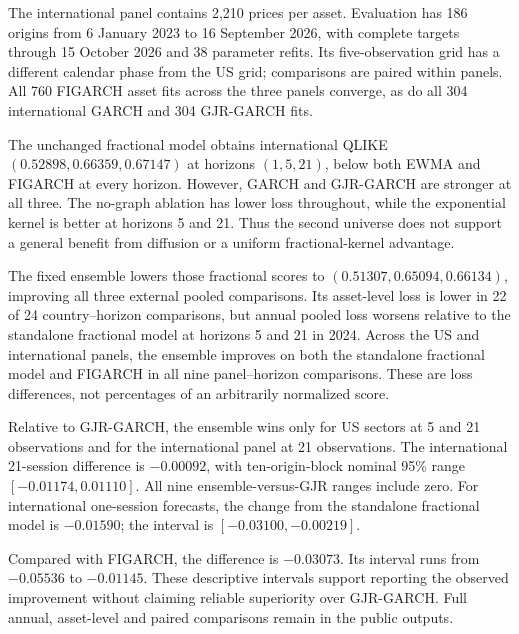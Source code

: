The international panel contains 2,210 prices per asset. Evaluation has
186 origins from 6 January 2023 to 16 September 2026, with complete targets
through 15 October 2026 and 38 parameter refits. Its five-observation grid
has a different calendar phase from the US grid; comparisons are paired
within panels. All 760 FIGARCH asset fits across the three panels converge,
as do all 304 international GARCH and 304 GJR-GARCH fits.

The unchanged fractional model obtains international QLIKE
$(0.52898,0.66359,0.67147)$ at horizons $(1,5,21)$, below both EWMA and FIGARCH
at every horizon. However, GARCH and GJR-GARCH are stronger at all three.
The no-graph ablation has lower loss throughout, while the exponential kernel
is better at horizons 5 and 21. Thus the second universe does not support a
general benefit from diffusion or a uniform fractional-kernel advantage.

The fixed ensemble lowers those fractional scores to
$(0.51307,0.65094,0.66134)$, improving all three external pooled comparisons.
Its asset-level loss is lower in 22 of 24 country--horizon comparisons, but
annual pooled loss worsens relative to the standalone fractional model at
horizons 5 and 21 in 2024. Across the US and international panels, the ensemble
improves on both the standalone fractional model and FIGARCH in all nine
panel--horizon comparisons. These are loss differences, not percentages of an
arbitrarily normalized score.

Relative to GJR-GARCH, the ensemble wins only for US sectors at 5 and 21
observations and for the international panel at 21 observations. The
international 21-session difference is $-0.00092$, with ten-origin-block
nominal 95\% range $[-0.01174,0.01110]$. All nine ensemble-versus-GJR ranges
include zero. For international one-session forecasts, the change from the
standalone fractional model is $-0.01590$; the interval is
$[-0.03100,-0.00219]$.

Compared with FIGARCH, the difference is $-0.03073$. Its interval runs from
$-0.05536$ to $-0.01145$. These descriptive intervals support reporting the
observed improvement without claiming reliable superiority over GJR-GARCH.
Full annual, asset-level and paired comparisons remain in the public outputs.
